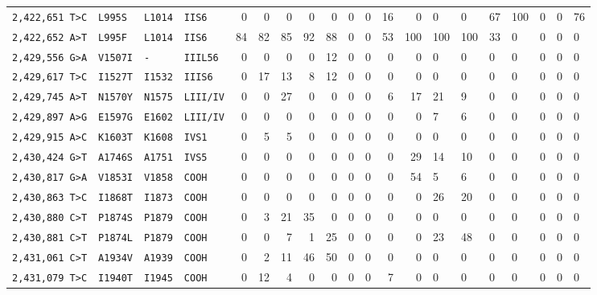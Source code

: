 \begin{tabular}{llllrrrrrrrrr}
\texttt{2,422,651 T>C} & \texttt{L995S} & \texttt{L1014} & \texttt{IIS6} & 0 & 0 & 0 & 0 & 0 & 0 & 0 & 16 & 0 & 0 & 0 & 67 & 100 & 0 & 0 & 76 \\

\texttt{2,422,652 A>T} & \texttt{L995F} & \texttt{L1014} & \texttt{IIS6} & 84 & 82 & 85 & 92 & 88 & 0 & 0 & 53 & 100 & 100 & 100 & 33 & 0 & 0 & 0 & 0 \\

\texttt{2,429,556 G>A} & \texttt{V1507I} & \texttt{-} & \texttt{IIIL56} & 0 & 0 & 0 & 0 & 12 & 0 & 0 & 0 & 0 & 0 & 0 & 0 & 0 & 0 & 0 & 0 \\

\texttt{2,429,617 T>C} & \texttt{I1527T} & \texttt{I1532} & \texttt{IIIS6} & 0 & 17 & 13 & 8 & 12 & 0 & 0 & 0 & 0 & 0 & 0 & 0 & 0 & 0 & 0 & 0 \\

\texttt{2,429,745 A>T} & \texttt{N1570Y} & \texttt{N1575} & \texttt{LIII/IV} & 0 & 0 & 27 & 0 & 0 & 0 & 0 & 6 & 17 & 21 & 9 & 0 & 0 & 0 & 0 & 0 \\

\texttt{2,429,897 A>G} & \texttt{E1597G} & \texttt{E1602} & \texttt{LIII/IV} & 0 & 0 & 0 & 0 & 0 & 0 & 0 & 0 & 0 & 7 & 6 & 0 & 0 & 0 & 0 & 0 \\

\texttt{2,429,915 A>C} & \texttt{K1603T} & \texttt{K1608} & \texttt{IVS1} & 0 & 5 & 5 & 0 & 0 & 0 & 0 & 0 & 0 & 0 & 0 & 0 & 0 & 0 & 0 & 0 \\

\texttt{2,430,424 G>T} & \texttt{A1746S} & \texttt{A1751} & \texttt{IVS5} & 0 & 0 & 0 & 0 & 0 & 0 & 0 & 0 & 29 & 14 & 10 & 0 & 0 & 0 & 0 & 0 \\

\texttt{2,430,817 G>A} & \texttt{V1853I} & \texttt{V1858} & \texttt{COOH} & 0 & 0 & 0 & 0 & 0 & 0 & 0 & 0 & 54 & 5 & 6 & 0 & 0 & 0 & 0 & 0 \\

\texttt{2,430,863 T>C} & \texttt{I1868T} & \texttt{I1873} & \texttt{COOH} & 0 & 0 & 0 & 0 & 0 & 0 & 0 & 0 & 0 & 26 & 20 & 0 & 0 & 0 & 0 & 0 \\

\texttt{2,430,880 C>T} & \texttt{P1874S} & \texttt{P1879} & \texttt{COOH} & 0 & 3 & 21 & 35 & 0 & 0 & 0 & 0 & 0 & 0 & 0 & 0 & 0 & 0 & 0 & 0 \\

\texttt{2,430,881 C>T} & \texttt{P1874L} & \texttt{P1879} & \texttt{COOH} & 0 & 0 & 7 & 1 & 25 & 0 & 0 & 0 & 0 & 23 & 48 & 0 & 0 & 0 & 0 & 0 \\

\texttt{2,431,061 C>T} & \texttt{A1934V} & \texttt{A1939} & \texttt{COOH} & 0 & 2 & 11 & 46 & 50 & 0 & 0 & 0 & 0 & 0 & 0 & 0 & 0 & 0 & 0 & 0 \\

\texttt{2,431,079 T>C} & \texttt{I1940T} & \texttt{I1945} & \texttt{COOH} & 0 & 12 & 4 & 0 & 0 & 0 & 0 & 7 & 0 & 0 & 0 & 0 & 0 & 0 & 0 & 0 \\

\bottomrule
\end{tabular}
